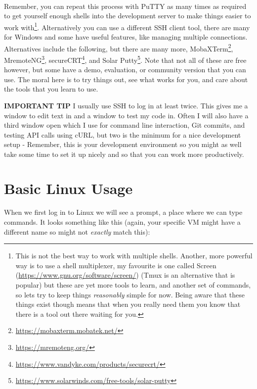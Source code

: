 \documentclass[12pt, a4paper, oneside]{book}
\begin{document}
\paragraph{} Remember, you can repeat this process with PuTTY as many times as required to get yourself enough shells into the development server to make things easier to work with\footnote{This is not the best way to work with multiple shells. Another, more powerful way is to use a shell multiplexer, my favourite is one called Screen (\url{https://www.gnu.org/software/screen/}) (Tmux is an alternative that is popular) but these are yet more tools to learn, and another set of commands, so lets try to keep things \emph{reasonably} simple for now. Being aware that these things exist though means that when you really need them you know that there is a tool out there waiting for you.}. Alternatively you can use a different SSH client tool, there are many for Windows and some have useful features, like managing multiple connections. Alternatives include the following, but there are many more, MobaXTerm\footnote{\url{https://mobaxterm.mobatek.net/}}, MremoteNG\footnote{\url{https://mremoteng.org/}}, secureCRT\footnote{\url{https://www.vandyke.com/products/securecrt/}}, and Solar Putty\footnote{\url{https://www.solarwinds.com/free-tools/solar-putty}}. Note that not all of these are free however, but some have a demo, evaluation, or community version that you can use. The moral here is to try things out, see what works for you, and care about the tools that you learn to use.

\begin{framed}
\textbf{IMPORTANT TIP} I usually use SSH to log in at least twice. This gives me a window to edit text in and a window to test my code in. Often I will also have a third window open which I use for command line interaction, Git commits, and testing API calls using cURL, but two is the minimum for a nice development setup - Remember, this is your development environment so you might as well take some time to set it up nicely and so that you can work more productively.
\end{framed}


\section{Basic Linux Usage}
\label{linux}

\paragraph{} When we first log in to Linux we will see a prompt, a place where we can type commands. It looks something like this (again, your specific VM might have a different name so might not \emph{exactly} match this):
\end{document}
